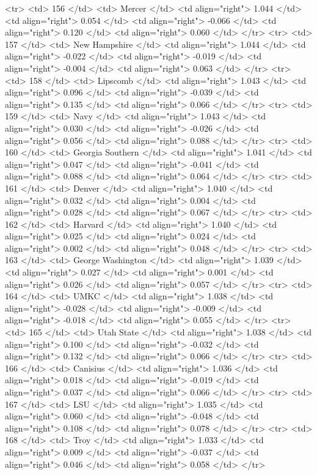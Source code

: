   <tr> <td> 156 </td> <td> Mercer </td> <td align="right"> 1.044 </td> <td align="right"> 0.054 </td> <td align="right"> -0.066 </td> <td align="right"> 0.120 </td> <td align="right"> 0.060 </td> </tr>
  <tr> <td> 157 </td> <td> New Hampshire </td> <td align="right"> 1.044 </td> <td align="right"> -0.022 </td> <td align="right"> -0.019 </td> <td align="right"> -0.004 </td> <td align="right"> 0.063 </td> </tr>
  <tr> <td> 158 </td> <td> Lipscomb </td> <td align="right"> 1.043 </td> <td align="right"> 0.096 </td> <td align="right"> -0.039 </td> <td align="right"> 0.135 </td> <td align="right"> 0.066 </td> </tr>
  <tr> <td> 159 </td> <td> Navy </td> <td align="right"> 1.043 </td> <td align="right"> 0.030 </td> <td align="right"> -0.026 </td> <td align="right"> 0.056 </td> <td align="right"> 0.088 </td> </tr>
  <tr> <td> 160 </td> <td> Georgia Southern </td> <td align="right"> 1.041 </td> <td align="right"> 0.047 </td> <td align="right"> -0.041 </td> <td align="right"> 0.088 </td> <td align="right"> 0.064 </td> </tr>
  <tr> <td> 161 </td> <td> Denver </td> <td align="right"> 1.040 </td> <td align="right"> 0.032 </td> <td align="right"> 0.004 </td> <td align="right"> 0.028 </td> <td align="right"> 0.067 </td> </tr>
  <tr> <td> 162 </td> <td> Harvard </td> <td align="right"> 1.040 </td> <td align="right"> 0.025 </td> <td align="right"> 0.024 </td> <td align="right"> 0.002 </td> <td align="right"> 0.048 </td> </tr>
  <tr> <td> 163 </td> <td> George Washington </td> <td align="right"> 1.039 </td> <td align="right"> 0.027 </td> <td align="right"> 0.001 </td> <td align="right"> 0.026 </td> <td align="right"> 0.057 </td> </tr>
  <tr> <td> 164 </td> <td> UMKC </td> <td align="right"> 1.038 </td> <td align="right"> -0.028 </td> <td align="right"> -0.009 </td> <td align="right"> -0.018 </td> <td align="right"> 0.055 </td> </tr>
  <tr> <td> 165 </td> <td> Utah State </td> <td align="right"> 1.038 </td> <td align="right"> 0.100 </td> <td align="right"> -0.032 </td> <td align="right"> 0.132 </td> <td align="right"> 0.066 </td> </tr>
  <tr> <td> 166 </td> <td> Canisius </td> <td align="right"> 1.036 </td> <td align="right"> 0.018 </td> <td align="right"> -0.019 </td> <td align="right"> 0.037 </td> <td align="right"> 0.066 </td> </tr>
  <tr> <td> 167 </td> <td> LSU </td> <td align="right"> 1.035 </td> <td align="right"> 0.060 </td> <td align="right"> -0.048 </td> <td align="right"> 0.108 </td> <td align="right"> 0.078 </td> </tr>
  <tr> <td> 168 </td> <td> Troy </td> <td align="right"> 1.033 </td> <td align="right"> 0.009 </td> <td align="right"> -0.037 </td> <td align="right"> 0.046 </td> <td align="right"> 0.058 </td> </tr>
